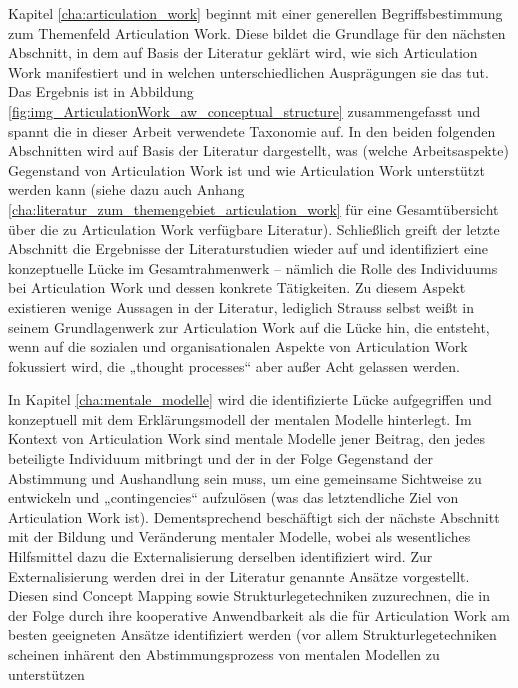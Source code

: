 Kapitel \ref{cha:articulation_work} beginnt mit einer generellen Begriffsbestimmung zum Themenfeld Articulation Work. Diese bildet die Grundlage für den nächsten Abschnitt, in dem auf Basis der Literatur geklärt wird, wie sich Articulation Work manifestiert und in welchen unterschiedlichen Ausprägungen sie das tut. Das Ergebnis ist in Abbildung \ref{fig:img_ArticulationWork_aw_conceptual_structure} zusammengefasst und spannt die in dieser Arbeit verwendete Taxonomie auf. In den beiden folgenden Abschnitten wird auf Basis der Literatur dargestellt, was (welche Arbeitsaspekte) Gegenstand von Articulation Work ist und wie Articulation Work unterstützt werden kann (siehe dazu auch Anhang \ref{cha:literatur_zum_themengebiet_articulation_work} für eine Gesamtübersicht über die zu Articulation Work verfügbare Literatur). Schließlich greift der letzte Abschnitt die Ergebnisse der Literaturstudien wieder auf und identifiziert eine konzeptuelle Lücke im Gesamtrahmenwerk -- nämlich die Rolle des Individuums bei Articulation Work und dessen konkrete Tätigkeiten. Zu diesem Aspekt existieren wenige Aussagen in der Literatur, lediglich Strauss selbst weißt in seinem Grundlagenwerk zur Articulation Work auf die Lücke hin, die entsteht, wenn auf die sozialen und organisationalen Aspekte von Articulation Work fokussiert wird, die „thought processes“ aber außer Acht gelassen werden.

In Kapitel \ref{cha:mentale_modelle} wird die identifizierte Lücke aufgegriffen und konzeptuell mit dem Erklärungsmodell der mentalen Modelle hinterlegt. Im Kontext von Articulation Work sind mentale Modelle jener Beitrag, den jedes beteiligte Individuum mitbringt und der in der Folge Gegenstand der Abstimmung und Aushandlung sein muss, um eine gemeinsame Sichtweise zu entwickeln und „contingencies“ aufzulösen (was das letztendliche Ziel von Articulation Work ist). Dementsprechend beschäftigt sich der nächste Abschnitt mit der Bildung und Veränderung mentaler Modelle, wobei als wesentliches Hilfsmittel dazu die Externalisierung derselben identifiziert wird. Zur Externalisierung werden drei in der Literatur genannte Ansätze vorgestellt. Diesen sind Concept Mapping sowie Strukturlegetechniken zuzurechnen, die in der Folge durch ihre kooperative Anwendbarkeit als die für Articulation Work am besten geeigneten Ansätze identifiziert werden (vor allem Strukturlegetechniken scheinen inhärent den Abstimmungsprozess von mentalen Modellen zu unterstützen

